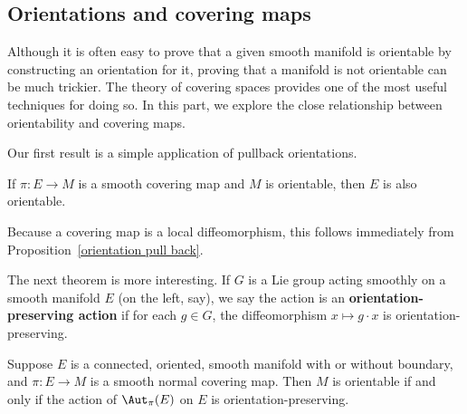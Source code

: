 \subsection{Orientations and covering maps}
Although it is often easy to prove that a given smooth manifold is orientable by constructing an orientation for it, proving that a manifold is not orientable can be much trickier. The theory of covering spaces provides one of the most useful techniques
for doing so. In this part, we explore the close relationship between orientability
and covering maps.\par
Our first result is a simple application of pullback orientations.
\begin{proposition}
If $\pi:E\to M$ is a smooth covering map and $M$ is orientable, then $E$ is also orientable.
\end{proposition}
\begin{proposition}
Because a covering map is a local diffeomorphism, this follows immediately from Proposition~\ref{orientation pull back}.
\end{proposition}
The next theorem is more interesting. If $G$ is a Lie group acting smoothly on a smooth manifold $E$ (on the left, say), we say the action is an \textbf{orientation-preserving action} if for each $g\in G$, the diffeomorphism $x\mapsto g\cdot x$ is orientation-preserving.
\begin{theorem}\label{orientation covering thm}
Suppose $E$ is a connected, oriented, smooth manifold with or without boundary, and $\pi:E\to M$ is a smooth normal covering map. Then $M$ is orientable if and only if the action of $\Aut_\pi(E)$ on $E$ is orientation-preserving.
\end{theorem}
